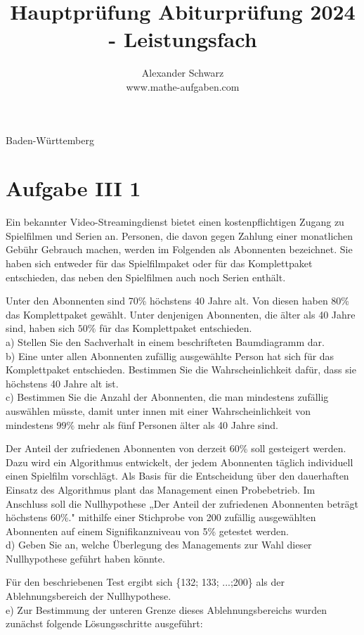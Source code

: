 \documentclass[10pt]{article}
\title{Hauptprüfung Abiturprüfung 2024 - Leistungsfach }
\author{Alexander Schwarz\\
www.mathe-aufgaben.com}
\date{}
\begin{document}
\maketitle
 Baden-Württemberg

\section*{Aufgabe III 1}
Ein bekannter Video-Streamingdienst bietet einen kostenpflichtigen Zugang zu Spielfilmen und Serien an. Personen, die davon gegen Zahlung einer monatlichen Gebühr Gebrauch machen, werden im Folgenden als Abonnenten bezeichnet. Sie haben sich entweder für das Spielfilmpaket oder für das Komplettpaket entschieden, das neben den Spielfilmen auch noch Serien enthält.

Unter den Abonnenten sind 70\% höchstens 40 Jahre alt. Von diesen haben 80\% das Komplettpaket gewählt. Unter denjenigen Abonnenten, die älter als 40 Jahre sind, haben sich $50 \%$ für das Komplettpaket entschieden.\\
a) Stellen Sie den Sachverhalt in einem beschrifteten Baumdiagramm dar.\\
b) Eine unter allen Abonnenten zufällig ausgewählte Person hat sich für das Komplettpaket entschieden. Bestimmen Sie die Wahrscheinlichkeit dafür, dass sie höchstens 40 Jahre alt ist.\\
c) Bestimmen Sie die Anzahl der Abonnenten, die man mindestens zufällig auswählen müsste, damit unter innen mit einer Wahrscheinlichkeit von mindestens $99 \%$ mehr als fünf Personen älter als 40 Jahre sind.

Der Anteil der zufriedenen Abonnenten von derzeit 60\% soll gesteigert werden. Dazu wird ein Algorithmus entwickelt, der jedem Abonnenten täglich individuell einen Spielfilm vorschlägt. Als Basis für die Entscheidung über den dauerhaften Einsatz des Algorithmus plant das Management einen Probebetrieb. Im Anschluss soll die Nullhypothese „Der Anteil der zufriedenen Abonnenten beträgt höchstens 60\%." mithilfe einer Stichprobe von 200 zufällig ausgewählten Abonnenten auf einem Signifikanzniveau von 5\% getestet werden.\\
d) Geben Sie an, welche Überlegung des Managements zur Wahl dieser Nullhypothese geführt haben könnte.

Für den beschriebenen Test ergibt sich \{132; 133; ...;200\} als der Ablehnungsbereich der Nullhypothese.\\
e) Zur Bestimmung der unteren Grenze dieses Ablehnungsbereichs wurden zunächst folgende Lösungsschritte ausgeführt:
\end{document}
